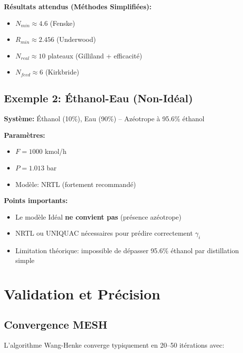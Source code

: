 \documentclass[11pt,a4paper]{article}
\begin{document}
\textbf{Résultats attendus (Méthodes Simplifiées):}
\begin{itemize}[leftmargin=*]
    \item $N_{min} \approx 4.6$ (Fenske)
    \item $R_{min} \approx 2.456$ (Underwood)
    \item $N_{real} \approx 10$ plateaux (Gilliland + efficacité)
    \item $N_{feed} \approx 6$ (Kirkbride)
\end{itemize}

\subsection{Exemple 2: Éthanol-Eau (Non-Idéal)}

\textbf{Système:} Éthanol (10\%), Eau (90\%) -- Azéotrope à 95.6\% éthanol

\textbf{Paramètres:}
\begin{itemize}[leftmargin=*]
    \item $F = 1000$ kmol/h
    \item $P = 1.013$ bar
    \item Modèle: NRTL (fortement recommandé)
\end{itemize}

\textbf{Points importants:}
\begin{itemize}[leftmargin=*]
    \item Le modèle Idéal \textbf{ne convient pas} (présence azéotrope)
    \item NRTL ou UNIQUAC nécessaires pour prédire correctement $\gamma_i$
    \item Limitation théorique: impossible de dépasser 95.6\% éthanol par distillation simple
\end{itemize}

\section{Validation et Précision}

\subsection{Convergence MESH}

L'algorithme Wang-Henke converge typiquement en 20--50 itérations avec:
\end{document}
